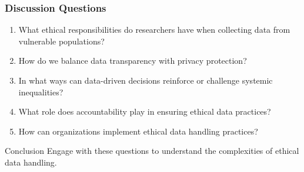 \documentclass[aspectratio=169]{beamer}
\begin{document}
\begin{frame}[fragile]
    \frametitle{Discussion Questions}
    
    \begin{enumerate}
        \item What ethical responsibilities do researchers have when collecting data from vulnerable populations?
        \item How do we balance data transparency with privacy protection?
        \item In what ways can data-driven decisions reinforce or challenge systemic inequalities?
        \item What role does accountability play in ensuring ethical data practices?
        \item How can organizations implement ethical data handling practices?
    \end{enumerate}
    
    \begin{block}{Conclusion}
        Engage with these questions to understand the complexities of ethical data handling.
    \end{block}
\end{frame}
\end{document}
